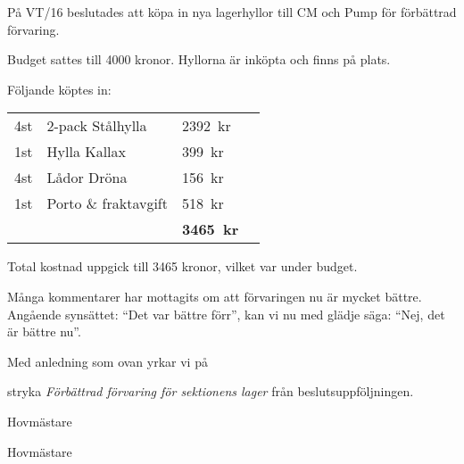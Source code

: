 \documentclass[../_main/handlingar.tex]{subfiles}
\begin{document}
På VT/16 beslutades att köpa in nya lagerhyllor till CM och Pump för förbättrad förvaring.

Budget sattes till 4000 kronor. Hyllorna är inköpta och finns på plats.

Följande köptes in:
\begin{table}[H]
\begin{tabular}{l l l r}
    4st & 2-pack Stålhylla & \SI{2392}{kr}\\
    1st & Hylla Kallax & \SI{399}{kr}\\
    4st & Lådor Dröna & \SI{156}{kr}\\
    1st & Porto \& fraktavgift & \SI{518}{kr}\\
    \hline
    & & \textbf{\SI{3465}{kr}}\\
\end{tabular}
\end{table}

Total kostnad uppgick till 3465 kronor, vilket var under budget.

Många kommentarer har mottagits om att förvaringen nu är mycket bättre. Angående
synsättet: ``Det var bättre förr'', kan vi nu med glädje säga: ``Nej, det är bättre nu''.

Med anledning som ovan yrkar vi på

\begin{attsatser}
    \att stryka \emph{Förbättrad förvaring för sektionens lager} från beslutsuppföljningen.
\end{attsatser}

\begin{signatures}{2}
    \mvh
    \signature{Sanna Nordberg}{Hovmästare}
    \signature{Matilda Dahlström}{Hovmästare}
\end{signatures}
\end{document}
